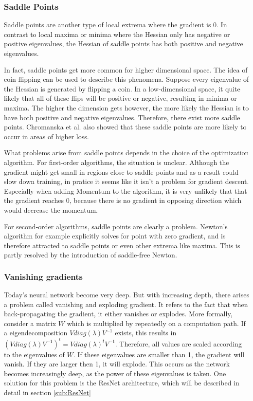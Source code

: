 \subsubsection{Saddle Points}\label{prob:3}
Saddle points are another type of local extrema where the gradient is 0. In
contrast to local maxima or minima where the Hessian only has negative or
positive eigenvalues, the Hessian of saddle points has both positive and
negative eigenvalues.

In fact, saddle points get more common for higher dimensional space. The idea of
coin flipping can be used to describe this phenomena. Suppose every eigenvalue
of the Hessian is generated by flipping a coin. In a low-dimensional space, it
quite likely that all of these flips will be positive or negative, resulting in
minima or maxima. The higher the dimension gets however, the more likely the
Hessian is to have both positive and negative eigenvalues. Therefore, there
exist more saddle points. Chromanska et al. \cite{choromanska2015loss} also showed that these saddle points
are more likely to occur in areas of higher loss.

What problems arise from saddle points depends in the choice of the optimization
algorithm. For first-order algorithms, the situation is unclear. Although the
gradient might get small in regions close to saddle points and as a result could
slow down training, in pratice it seems like it isn't a problem for gradient
descent. Especially when adding Momentum to the algorithm, it is very unlikely
that that the gradient reaches 0, because there is no gradient in opposing
direction which would decrease the momentum.

For second-order algorithms, saddle points are clearly a problem. Newton's
algorithm for example explicitly solves for point with zero gradient, and is
therefore attracted to saddle points or even other extrema like maxima. This is
partly resolved by the introduction of saddle-free Newton. 


\subsubsection{Vanishing gradients}\label{sub:Vanishing_gradient}
Today's neural network become very deep. But with increasing depth, there arises
a problem called vanishing and exploding gradient. It refers to the fact that
when back-propagating the gradient, it either vanishes or explodes. More
formally, consider a matrix $W$ which is multiplied by repeatedly on a
computation path. If a eigendecomposition $Vdiag(\lambda )V^{-1}$ exists, this
results in $(Vdiag(\lambda )V^{-1})^t=Vdiag(\lambda )^tV^{-1}$. Therefore, all
values are scaled according to the eigenvalues of $W$. If these eigenvalues are
smaller than 1, the gradient will vanish. If they are larger then 1, it will
explode. This occurs as the network becomes increasingly deep, as the power of
these eigenvalues is taken. One solution for this problem is the ResNet
architecture, which will be described in detail in section \ref{sub:ResNet}

